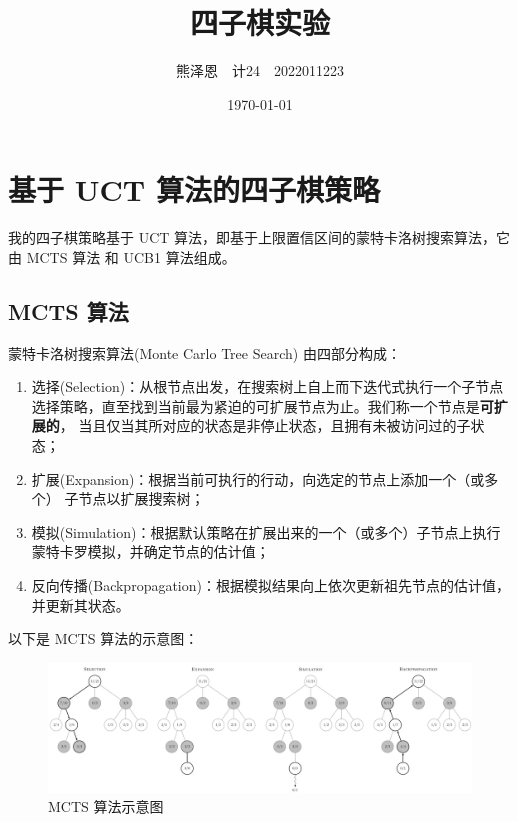 \documentclass[UTF8]{ctexart}
\title{四子棋实验}
\author{熊泽恩~~计24~~2022011223}
\date{\today}
\begin{document}
\maketitle

\tableofcontents

\newpage

\section{基于 UCT 算法的四子棋策略}

我的四子棋策略基于 UCT 算法，即基于上限置信区间的蒙特卡洛树搜索算法，它由 MCTS 算法
和 UCB1 算法组成。

\subsection{MCTS 算法}

蒙特卡洛树搜索算法(Monte Carlo Tree Search) 由四部分构成：
\begin{enumerate}
    \item 选择(Selection)：从根节点出发，在搜索树上自上而下迭代式执行一个子节点
            选择策略，直至找到当前最为紧迫的可扩展节点为止。我们称一个节点是\textbf{可扩展的}，
            当且仅当其所对应的状态是非停止状态，且拥有未被访问过的子状态；
    \item 扩展(Expansion)：根据当前可执行的行动，向选定的节点上添加一个（或多个）
            子节点以扩展搜索树；
    \item 模拟(Simulation)：根据默认策略在扩展出来的一个（或多个）子节点上执行
            蒙特卡罗模拟，并确定节点的估计值；
    \item 反向传播(Backpropagation)：根据模拟结果向上依次更新祖先节点的估计值，
            并更新其状态。
\end{enumerate}

以下是 MCTS 算法的示意图：

\begin{figure}[H]
    \centering
    \includegraphics[width=\textwidth]{../assets/MCTS.png}
    \caption{MCTS 算法示意图 \cite{MCTS-steps}}
\end{figure}
\end{document}

